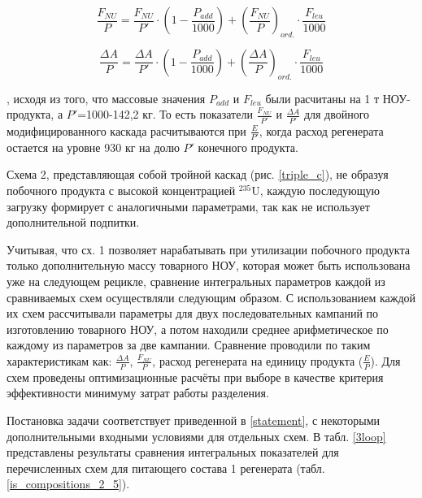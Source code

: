 \begin{equation} \label{Fnu_plus} 
    \frac{F_{NU}}{P}=\frac{F_{NU}}{P'}\cdot (1 - \frac{P_{add}}{1000}) + (\frac{F_{NU}}{P})_{ord.}\cdot \frac{F_{leu}}{1000}
\end{equation} 

\begin{equation} \label{AvsP_plus} 
    \frac{\Delta A}{P}=\frac{\Delta A}{P'}\cdot (1 - \frac{P_{add}}{1000}) + (\frac{\Delta A}{P})_{ord.}\cdot \frac{F_{leu}}{1000}
\end{equation} 

, исходя из того, что массовые значения $P_{add}$ и $F_{leu}$ были расчитаны на 1 т НОУ-продукта, а $P'$=1000-142,2 кг. То есть показатели $\frac{F_{NU}}{P'}$ и
$\frac{\Delta A}{P'}$ для двойного модифицированного каскада расчитываются при $\frac{E}{P'}$, когда расход регенерата остается на уровне 930 кг на долю $P'$ конечного продукта.

Схема 2, представляющая собой тройной каскад (рис. \ref{triple_c}), не образуя побочного продукта с высокой концентрацией $^{235}$U, каждую последующую загрузку формирует с аналогичными параметрами, так как не использует дополнительной подпитки.

Учитывая, что сх. 1 позволяет нарабатывать при утилизации побочного продукта только дополнительную массу товарного НОУ, которая может быть использована уже на следующем рецикле, сравнение интегральных параметров каждой из сравниваемых схем осуществляли следующим образом. С использованием каждой их схем рассчитывали параметры для двух последовательных кампаний по изготовлению товарного НОУ, а потом находили среднее арифметическое по каждому из параметров за две кампании. Сравнение проводили по таким характеристикам как: $\frac{\Delta A}{P}$, $\frac{F_{NU}}{P}$, расход регенерата на единицу продукта ($\frac{E}{P}$). Для схем проведены оптимизационные расчёты при выборе в качестве критерия эффективности минимуму затрат работы разделения.

Постановка задачи соответствует приведенной в \ref{statement}, с некоторыми дополнительными входными условиями для отдельных схем.
В табл. \ref{3loop} представлены результаты сравнения интегральных показателей для перечисленных схем для питающего состава 1 регенерата (табл. \ref{is_compositions_2_5}).

